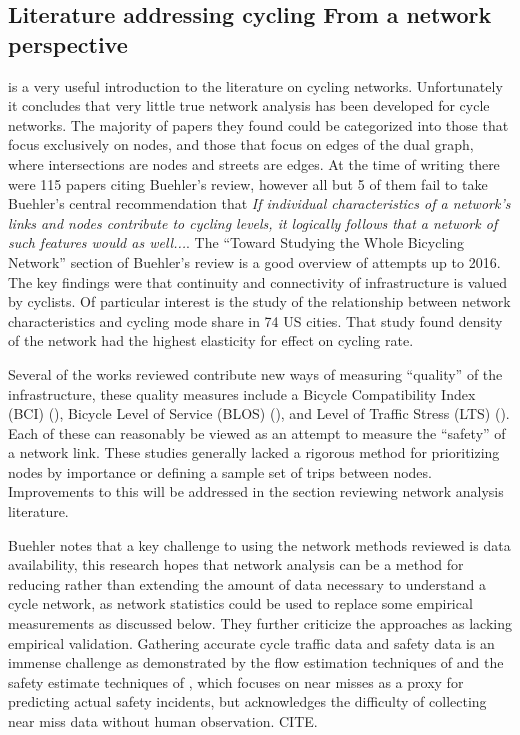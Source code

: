 \documentclass[11pt]{article} %
\begin{document}

\subsection{Literature addressing cycling From a network perspective}


\cite{buehler2016bikeway} is a very useful introduction to the literature on cycling networks. Unfortunately it concludes that very little true network analysis has been developed for cycle networks. The majority of papers they found could be categorized into those that focus exclusively on nodes, and those that focus on edges of the dual graph, where intersections are nodes and streets are edges. At the time of writing there were 115 papers citing Buehler's review, however all but 5 of them fail to take Buehler's central recommendation that \textit{If individual characteristics of a network's links and nodes contribute to cycling levels, it logically follows that a network of such features would as well...}. The ``Toward Studying the Whole Bicycling Network'' section of Buehler's review is a good overview of attempts up to 2016. The key findings were that continuity and connectivity of infrastructure is valued by cyclists. Of particular interest is the \cite{schoner2014missing} study of the relationship between network characteristics and cycling mode share in 74 US cities. That study found density of the network had the highest elasticity for effect on cycling rate. 

Several of the works reviewed contribute new ways of measuring ``quality'' of the infrastructure, these quality measures include a Bicycle Compatibility Index (BCI) (\cite{klobucar2007network}),  Bicycle Level of Service (BLOS) (\cite{lowry2012assessment}), and Level of Traffic Stress (LTS) (\cite{mekuria2012low}). Each of these can reasonably be viewed as an attempt to measure the ``safety'' of a network link. These studies generally lacked a rigorous method for prioritizing nodes by importance or defining a sample set of trips between nodes. Improvements to this will be addressed in the section reviewing network analysis literature. 

Buehler notes that a key challenge to using the network methods reviewed is data availability, this research hopes that network analysis can be a method for reducing rather than extending the amount of data necessary to understand a cycle network, as network statistics could be used to replace some empirical measurements as discussed below.  They further criticize the approaches as lacking empirical validation. Gathering accurate cycle traffic data and safety data is an immense challenge as demonstrated by the flow estimation techniques of \cite{gosse2014estimating} and the safety estimate techniques of \cite{puchades2018role}, which focuses on near misses as a proxy for predicting actual safety incidents, but acknowledges the difficulty of collecting near miss data without human observation. CITE. 
\end{document}
